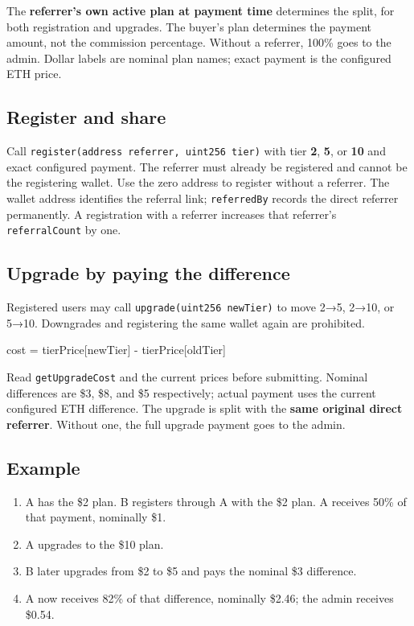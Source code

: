 \documentclass[
  10pt,
  letterpaper,
]{article}
\newenvironment{Shaded}{}{}
\newcommand{\NormalTok}[1]{#1}
\providecommand{\tightlist}{%
  \setlength{\itemsep}{0pt}\setlength{\parskip}{0pt}}
\begin{document}
The \textbf{referrer's own active plan at payment time} determines the
split, for both registration and upgrades. The buyer's plan determines
the payment amount, not the commission percentage. Without a referrer,
100\% goes to the admin. Dollar labels are nominal plan names; exact
payment is the configured ETH price.

\subsection{Register and share}\label{register-and-share}

Call \texttt{register(address\ referrer,\ uint256\ tier)} with tier
\textbf{2}, \textbf{5}, or \textbf{10} and exact configured payment. The
referrer must already be registered and cannot be the registering
wallet. Use the zero address to register without a referrer. The wallet
address identifies the referral link; \texttt{referredBy} records the
direct referrer permanently. A registration with a referrer increases
that referrer's \texttt{referralCount} by one.

\subsection{Upgrade by paying the
difference}\label{upgrade-by-paying-the-difference}

Registered users may call \texttt{upgrade(uint256\ newTier)} to move
2→5, 2→10, or 5→10. Downgrades and registering the same wallet again are
prohibited.

\begin{Shaded}
\begin{Highlighting}[]
\NormalTok{cost = tierPrice[newTier] {-} tierPrice[oldTier]}
\end{Highlighting}
\end{Shaded}

Read \texttt{getUpgradeCost} and the current prices before submitting.
Nominal differences are \$3, \$8, and \$5 respectively; actual payment
uses the current configured ETH difference. The upgrade is split with
the \textbf{same original direct referrer}. Without one, the full
upgrade payment goes to the admin.

\subsection{Example}\label{example}

\begin{enumerate}
\def\labelenumi{\arabic{enumi}.}
\tightlist
\item
  A has the \$2 plan. B registers through A with the \$2 plan. A
  receives 50\% of that payment, nominally \$1.
\item
  A upgrades to the \$10 plan.
\item
  B later upgrades from \$2 to \$5 and pays the nominal \$3 difference.
\item
  A now receives 82\% of that difference, nominally \$2.46; the admin
  receives \$0.54.
\end{enumerate}
\end{document}
